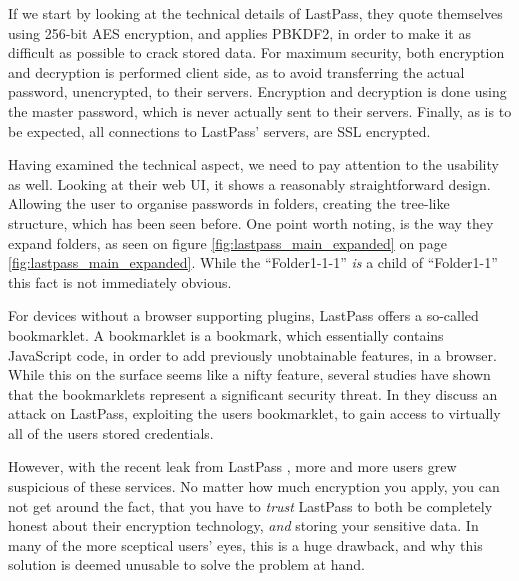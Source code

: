 			If we start by looking at the technical details of LastPass, they quote themselves using 256-bit AES encryption, and applies PBKDF2, in order to make it as difficult as possible to crack stored data. For maximum security, both encryption and decryption is performed client side\cite{lastpass_cleintsideencryption}, as to avoid transferring the actual password, unencrypted, to their servers. Encryption and decryption is done using the master password, which is never actually sent to their servers. Finally, as is to be expected, all connections to LastPass' servers, are SSL encrypted.


			Having examined the technical aspect, we need to pay attention to the usability as well. Looking at their web UI, it shows a reasonably straightforward design. Allowing the user to organise passwords in folders, creating the tree-like structure, which has been seen before. One point worth noting, is the way they expand folders, as seen on figure \ref{fig:lastpass_main_expanded} on page \ref{fig:lastpass_main_expanded}. While the ``Folder1-1-1'' \emph{is} a child of ``Folder1-1'' this fact is not immediately obvious.

			For devices without a browser supporting plugins, LastPass offers a so-called bookmarklet\cite{lastpass_bookmarklet}. A bookmarklet is a bookmark, which essentially contains JavaScript code, in order to add previously unobtainable features, in a browser. While this on the surface seems like a nifty feature, several studies have shown that the bookmarklets represent a significant security threat. In \cite{bookmarklet} they discuss an attack on LastPass, exploiting the users bookmarklet, to gain access to virtually all of the users stored credentials.

			However, with the recent leak from LastPass \cite{lastpass_leak}, more and more users grew suspicious of these services. No matter how much encryption you apply, you can not get around the fact, that you have to \emph{trust} LastPass to both be completely honest about their encryption technology, \emph{and} storing your sensitive data. In many of the more sceptical users' eyes, this is a huge drawback, and why this solution is deemed unusable to solve the problem at hand.



